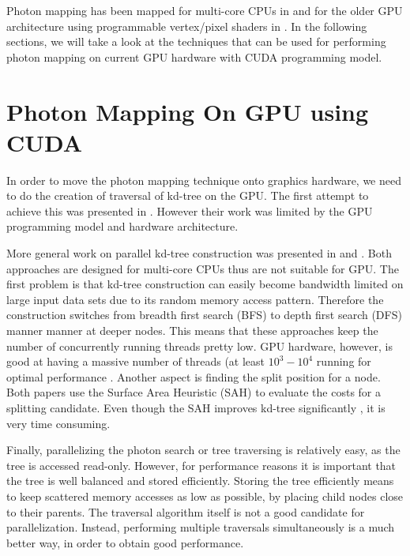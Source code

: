 Photon mapping has been mapped for multi-core CPUs in \cite{gunther:realtime} and for the older GPU architecture using programmable vertex/pixel shaders in \cite{Purcell:2005:PMP:1198555.1198797}. In the following sections, we will take a look at the techniques that can
be used for performing photon mapping on current GPU hardware with CUDA programming model.


\section{Photon Mapping On GPU using CUDA}

In order to move the photon mapping technique onto graphics hardware, we need to do the creation of traversal of kd-tree on the GPU. The first attempt to achieve this was presented in \cite{Purcell:2005:PMP:1198555.1198797}. However their work was limited by the GPU programming model and hardware architecture.

More general work on parallel kd-tree construction was presented in \cite{popov:06:ESC} and \cite{Shevtsov_highlyparallel}. Both approaches are designed for multi-core CPUs thus are not suitable for GPU. The first problem is that kd-tree construction can easily become bandwidth limited on large input data sets due to its random memory access pattern. Therefore the construction switches from breadth first search (BFS) to depth first search (DFS) manner manner at deeper nodes. This means that these approaches keep the number of concurrently running threads pretty low. GPU hardware, however, is good at having a massive number of threads (at least \(10^{3} - 10^{4}\) running for
optimal performance \cite{Guide2012}.
Another aspect is finding the split position for a node. Both papers use the Surface Area Heuristic (SAH) \cite{springerlink:10.1007/BF01911006} to evaluate the costs for a splitting candidate. Even though the SAH improves kd-tree significantly \cite{wald::PhD}, it is very time consuming.

Finally, parallelizing the photon search or tree traversing is relatively easy, as the tree is accessed read-only. However, for performance reasons it is important that the tree is well balanced and stored efficiently. Storing the tree efficiently means to keep scattered memory accesses as low as possible, by placing child nodes close to their parents. The traversal algorithm itself is not a good candidate for parallelization. Instead, performing multiple traversals simultaneously is a much better way, in order to obtain good performance.

